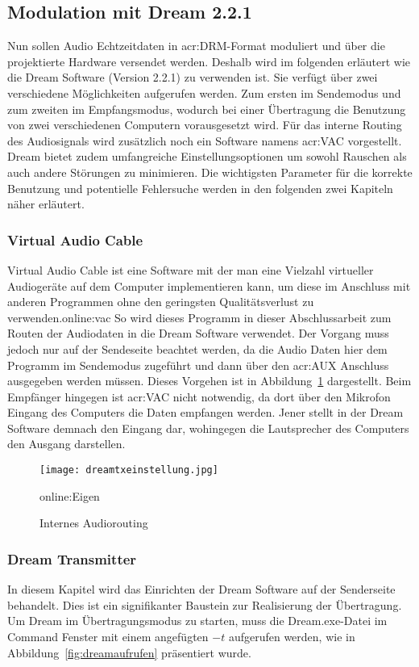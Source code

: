 \newpage
\subsection{Modulation mit Dream 2.2.1}
\label{subsec:dream}
Nun sollen Audio Echtzeitdaten in \gls{acr:DRM}-Format moduliert und über die projektierte Hardware versendet werden. Deshalb wird im folgenden erläutert wie die Dream Software (Version 2.2.1) zu verwenden ist. Sie verfügt über zwei verschiedene Möglichkeiten aufgerufen werden. Zum ersten im Sendemodus und zum zweiten im Empfangsmodus, wodurch bei einer Übertragung die Benutzung von zwei verschiedenen Computern vorausgesetzt wird. Für das interne Routing des Audiosignals wird zusätzlich noch ein Software namens \gls{acr:VAC} vorgestellt. Dream bietet zudem umfangreiche Einstellungsoptionen um sowohl Rauschen als auch andere Störungen zu minimieren. Die wichtigsten Parameter für die korrekte Benutzung und potentielle Fehlersuche werden in den folgenden zwei Kapiteln näher erläutert.

\subsubsection{Virtual Audio Cable}
\label{subsubsec:routing}
Virtual Audio Cable ist eine Software mit der man eine Vielzahl virtueller Audiogeräte auf dem Computer implementieren kann, um diese im Anschluss mit anderen Programmen ohne den geringsten Qualitätsverlust zu verwenden.\gls{online:vac} So wird dieses Programm in dieser Abschlussarbeit zum Routen der Audiodaten in die Dream Software verwendet. Der Vorgang muss jedoch nur auf der Sendeseite beachtet werden, da die Audio Daten hier dem Programm im Sendemodus zugeführt und dann über den \gls{acr:AUX} Anschluss ausgegeben werden müssen. Dieses Vorgehen ist in Abbildung~\ref{fig:dreamtxeinstellung} dargestellt. Beim Empfänger hingegen ist \gls{acr:VAC} nicht notwendig, da dort über den Mikrofon Eingang des Computers die Daten empfangen werden. Jener stellt in der Dream Software demnach den Eingang dar, wohingegen die Lautsprecher des Computers den Ausgang darstellen.

\begin{figure}[H]
	\centering
	\texttt{[image: dreamtxeinstellung.jpg]}
	\caption[Internes Audiorouting]{Internes Audiorouting} \gls{online:Eigen}
	\label{fig:dreamtxeinstellung}
\end{figure}


\subsubsection{Dream Transmitter}
\label{subsubsec:dreamtx}
In diesem Kapitel wird das Einrichten der Dream Software auf der Senderseite behandelt. Dies ist ein signifikanter Baustein zur Realisierung der Übertragung. Um Dream im Übertragungsmodus zu starten, muss die Dream.exe-Datei im Command Fenster mit einem angefügten $-t$ aufgerufen werden, wie in Abbildung~\ref{fig:dreamaufrufen} präsentiert wurde.

